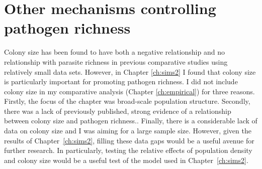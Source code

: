 




\section{Other mechanisms controlling pathogen richness}

Colony size has been found to have both a negative relationship \cite{gay2014parasite} and no relationship \cite{turmelle2009correlates} with parasite richness in previous comparative studies using relatively small data sets.
However, in Chapter \ref{ch:sims2} I found that colony size is particularly important for promoting pathogen richness.
I did not include colony size in my comparative analysis (Chapter \ref{ch:empirical}) for three reasons.
Firstly, the focus of the chapter was broad-scale population structure.
Secondly, there was a lack of previously published, strong evidence of a relationship between colony size and pathogen richness.\cite{turmelle2009correlates}.
Finally, there is a considerable lack of data on colony size and I was aiming for a large sample size.
However, given the results of Chapter~\ref{ch:sims2}, filling these data gaps would be a useful avenue for further research.
In particularly, testing the relative effects of population density and colony size would be a useful test of the model used in Chapter~\ref{ch:sims2}.

